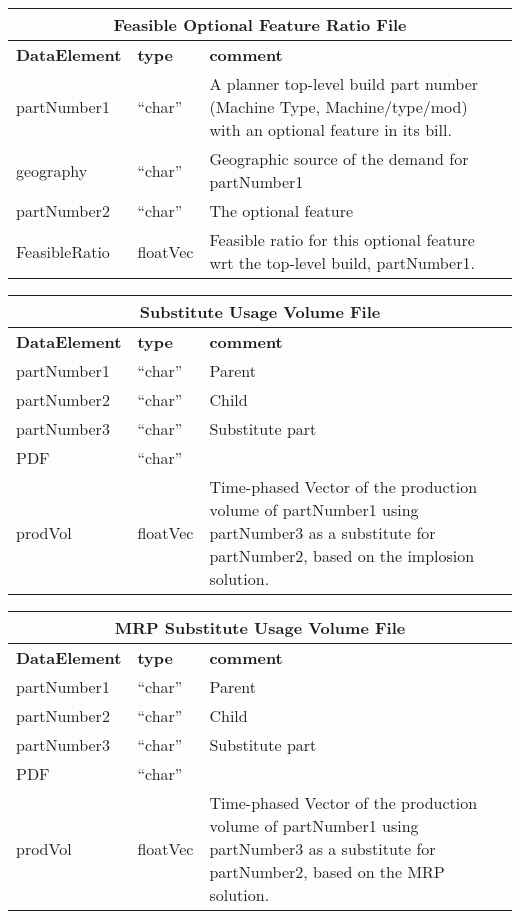 \begin{tabular}{llp{4in}}
\multicolumn{3}{c}{{\bf Feasible Optional Feature Ratio File}}\\ \hline\hline
{\bf DataElement} &  {\bf type}  &   {\bf comment} \\ \hline
partNumber1  & ``char'' &       A planner top-level build part number 
                            (Machine Type, Machine/type/mod)
                            with an optional feature in its bill.  \\
geography    & ``char'' &      Geographic source of the demand for partNumber1 \\
partNumber2  & ``char'' &      The optional feature \\

FeasibleRatio    & floatVec &   Feasible ratio for this optional feature wrt
                        the top-level build, partNumber1. \\
\end{tabular}

\vspace{.5in}


\begin{tabular}{llp{4in}}
\multicolumn{3}{c}{{\bf Substitute Usage Volume File}}\\ \hline\hline
{\bf DataElement} &  {\bf type}  &   {\bf comment} \\ \hline
partNumber1 & ``char''  & Parent\\
partNumber2 & ``char''  & Child \\
partNumber3 & ``char''  & Substitute part\\
PDF        & ``char''  \\
prodVol    & floatVec &  Time-phased Vector of the production volume of
                      partNumber1 using partNumber3 as a substitute for
                      partNumber2, based on the implosion solution.\\
\end{tabular}

\vspace{.5in}

\begin{tabular}{llp{4in}}
\multicolumn{3}{c}{{\bf MRP Substitute Usage Volume File}}\\ \hline\hline
{\bf DataElement} &  {\bf type}  &   {\bf comment} \\ \hline
partNumber1 & ``char''  & Parent\\
partNumber2 & ``char''  & Child \\
partNumber3 & ``char''  & Substitute part\\
PDF        & ``char''  \\
prodVol    & floatVec &  Time-phased Vector of the production volume of
                      partNumber1 using partNumber3 as a substitute for
                      partNumber2, based on the MRP solution. \\
\end{tabular}

